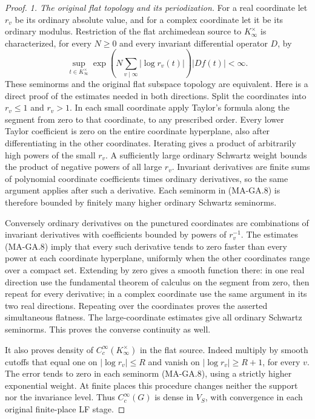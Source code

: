 \begin{proof}
\emph{1. The original flat topology and its periodization.}
For a real coordinate let $r_v$ be its ordinary absolute
value, and for a complex coordinate let it be its ordinary
modulus.  Restriction of the flat archimedean source to
$K_\infty^\times$ is characterized, for every $N\geq0$
and every invariant differential operator $D$, by
\[
 \sup_{t\in K_\infty^\times}
    \exp\!\left(N\sum_{v\mid\infty}|\log r_v(t)|\right)
       |D f(t)|<\infty.
 \tag{MA-GA.8}
\]
These seminorms and the original flat subspace topology are
equivalent.  Here is a direct proof of the estimates needed
in both directions.  Split the coordinates into $r_v\leq1$
and $r_v>1$.  In each small coordinate apply Taylor's formula
along the segment from zero to that coordinate, to any
prescribed order.  Every lower Taylor coefficient is zero
on the entire coordinate hyperplane, also after differentiating
in the other coordinates.  Iterating gives a product of
arbitrarily high powers of the small $r_v$.  A sufficiently
large ordinary Schwartz weight bounds the product of negative
powers of all large $r_v$.  Invariant derivatives are finite
sums of polynomial coordinate coefficients times ordinary
derivatives, so the same argument applies after such a
derivative.  Each seminorm in (MA-GA.8) is therefore bounded
by finitely many higher ordinary Schwartz seminorms.

Conversely ordinary derivatives on the punctured coordinates
are combinations of invariant derivatives with coefficients
bounded by powers of $r_v^{-1}$.  The estimates (MA-GA.8)
imply that every such derivative tends to zero faster than
every power at each coordinate hyperplane, uniformly when
the other coordinates range over a compact set.  Extending
by zero gives a smooth function there: in one real direction
use the fundamental theorem of calculus on the segment from
zero, then repeat for every derivative; in a complex coordinate
use the same argument in its two real directions.  Repeating
over the coordinates proves the asserted simultaneous flatness.
The large-coordinate estimates give all ordinary Schwartz
seminorms.  This proves the converse continuity as well.

It also proves density of $C_c^\infty(K_\infty^\times)$ in
the flat source.  Indeed multiply by smooth cutoffs that equal
one on $|\log r_v|\leq R$ and vanish on
$|\log r_v|\geq R+1$, for every $v$.  The error tends to zero
in each seminorm (MA-GA.8), using a strictly higher exponential
weight.  At finite places this procedure changes neither
the support nor the invariance level.  Thus
$C_c^\infty(G)$ is dense in $V_S$, with convergence in each
original finite-place LF stage.


\end{proof}
